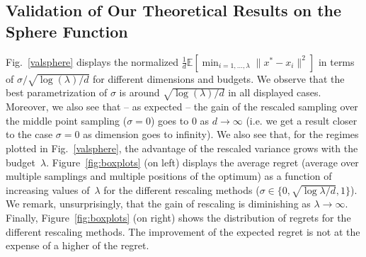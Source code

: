 \subsection{Validation of Our Theoretical Results on the Sphere Function}
\label{laurentsigma}
Fig.~\ref{valsphere} displays the normalized  $\frac1d\mathbb{E}\left[\min_{i=1,\ldots,\lambda}\lVert x^*-x_i\rVert^2 \right] $ in terms of %
$\sigma/\sqrt{\log(\lambda)/d}$ 
for different dimensions and budgets. We observe that the best parametrization of $\sigma$ is around $\sqrt{\log(\lambda)/d}$ in all displayed cases. Moreover, we also see that -- as expected -- the gain of the rescaled sampling over the middle point sampling ($\sigma=0$) goes to $0$ as $d\rightarrow\infty$ (i.e. we get a result closer to the case $\sigma=0$ as dimension goes to infinity). We also see that, for the regimes plotted in Fig.~\ref{valsphere}, the advantage of the rescaled variance grows with the budget~$\lambda$. Figure~\ref{fig:boxplots} (on left) displays the average regret (average over multiple samplings and multiple positions of the optimum) as a function of increasing values of~$\lambda$ for the different rescaling methods ($\sigma\in\{0,\sqrt{\log \lambda/d},1\}$). We remark, unsurprisingly, that the gain of rescaling is diminishing as $\lambda\rightarrow\infty$. Finally, Figure~\ref{fig:boxplots} (on right) shows the distribution of regrets for the different rescaling methods. The improvement of the expected regret is not at the expense of a higher  %
of the regret. 
